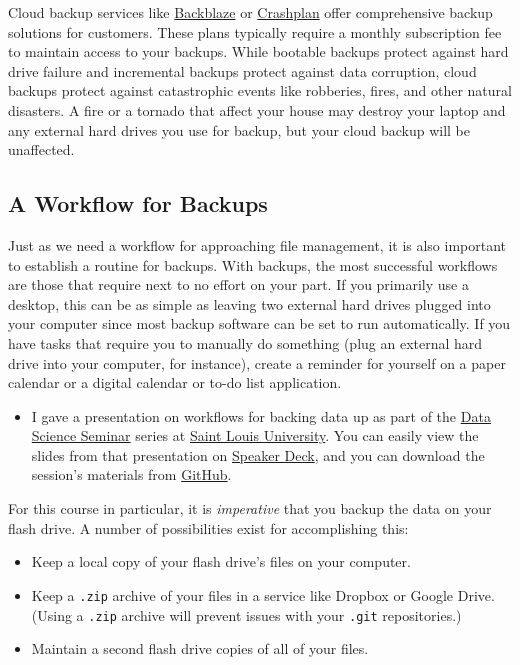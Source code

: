 \documentclass[]{book}
\providecommand{\tightlist}{%
  \setlength{\itemsep}{0pt}\setlength{\parskip}{0pt}}
\newenvironment{rmdblock}[1]
  {\begin{shaded*}
  \begin{itemize}
  \renewcommand{\labelitemi}{
    \raisebox{-.7\height}[0pt][0pt]{
      {\setkeys{Gin}{width=3em,keepaspectratio}\texttt{[image: images/\#1]}}
    }
  }
  \item
  }
  {
  \end{itemize}
  \end{shaded*}
  }
\newenvironment{rmdtip}
  {\begin{rmdblock}{tip}}
  {\end{rmdblock}}
\theoremstyle{definition}
\theoremstyle{definition}
\theoremstyle{definition}
\theoremstyle{remark}
\begin{document}
Cloud backup services like \href{https://www.backblaze.com}{Backblaze}
or \href{https://www.code42.com/crashplan/}{Crashplan} offer
comprehensive backup solutions for customers. These plans typically
require a monthly subscription fee to maintain access to your backups.
While bootable backups protect against hard drive failure and
incremental backups protect against data corruption, cloud backups
protect against catastrophic events like robberies, fires, and other
natural disasters. A fire or a tornado that affect your house may
destroy your laptop and any external hard drives you use for backup, but
your cloud backup will be unaffected.

\subsection{A Workflow for Backups}\label{a-workflow-for-backups}

Just as we need a workflow for approaching file management, it is also
important to establish a routine for backups. With backups, the most
successful workflows are those that require next to no effort on your
part. If you primarily use a desktop, this can be as simple as leaving
two external hard drives plugged into your computer since most backup
software can be set to run automatically. If you have tasks that require
you to manually do something (plug an external hard drive into your
computer, for instance), create a reminder for yourself on a paper
calendar or a digital calendar or to-do list application.

\begin{rmdtip}
I gave a presentation on workflows for backing data up as part of the
\href{https://slu-dss.github.io}{Data Science Seminar} series at
\href{https://slu.edu}{Saint Louis University}. You can easily view the
slides from that presentation on
\href{https://speakerdeck.com/chrisprener/protecting-your-data}{Speaker
Deck}, and you can download the session's materials from
\href{https://github.com/slu-dss/protectData}{GitHub}.
\end{rmdtip}

For this course in particular, it is \emph{imperative} that you backup
the data on your flash drive. A number of possibilities exist for
accomplishing this:

\begin{itemize}
\tightlist
\item
  Keep a local copy of your flash drive's files on your computer.
\item
  Keep a \texttt{.zip} archive of your files in a service like Dropbox
  or Google Drive. (Using a \texttt{.zip} archive will prevent issues
  with your \texttt{.git} repositories.)
\item
  Maintain a second flash drive copies of all of your files.
\end{itemize}
\end{document}
